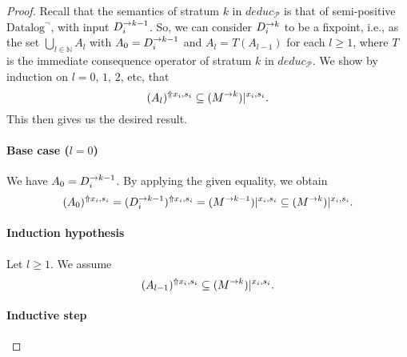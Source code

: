 \documentclass{tlp}
\newcommand{\langname}[1]{\text{#1}}  \newcommand{\pred}[1]{\mathtt{#1}}  \newcommand{\fname}[1]{\mathit{#1}}  \newcommand{\sq}[1]{`{#1}'}
\newcommand{\datalogneg}{\langname{Datalog}^{\neg}}
\newcommand{\Nat}{\mathbb{N}}  \newcommand{\len}[1]{|#1|} \newcommand{\rom}[1]{\text{\emph{(#1)}}} \newcommand{\romI}{\rom i}
\newcommand{\ded}{\mathcal{P}}
\newcommand{\sh}[1]{(#1)}
\newcommand{\addlt}[3]{#1^{\Uparrow#2,#3}}
\newcommand{\projlt}[3]{#1|^{#2,#3}}
\newcommand{\shprojlt}[3]{\projlt{\sh{#1}}{#2}{#3}}
\newcommand{\shaddlt}[3]{\addlt{\sh{#1}}{#2}{#3}}
\newcommand{\deduc}[1]{\fname{deduc}_{#1}}
\begin{document}
\begin{appendix}
\begin{proof}Recall that the semantics of stratum $k$ in $\deduc{\ded}$
is that of semi-positive $\datalogneg$, with input $D_{i}^{\to k-1}$.
So, we can consider $D_{i}^{\to k}$ to be a fixpoint, i.e., as the
set $\bigcup_{l\in\Nat}A_{l}$ with $A_{0}=D_{i}^{\to k-1}$ and
$A_{l}=T(A_{l-1})$ for each $l\geq1$, where $T$ is the immediate
consequence operator of stratum $k$ in $\deduc{\ded}$. We show by
induction on $l=0$, $1$, $2$, etc, that 
\[
\shaddlt{A_{l}}{x_{i}}{s_{i}}\subseteq\shprojlt{\strat Mk}{x_{i}}{s_{i}}.
\]
This then gives us the desired result.


\paragraph*{Base case ($l=0$)}

We have $A_{0}=D_{i}^{\to k-1}$. By applying the given equality,
we obtain 
\[
\shaddlt{A_{0}}{x_{i}}{s_{i}}=\shaddlt{\strat{D_{i}}{k-1}}{x_{i}}{s_{i}}=\shprojlt{\strat M{k-1}}{x_{i}}{s_{i}}\subseteq\shprojlt{\strat Mk}{x_{i}}{s_{i}}.
\]



\paragraph*{Induction hypothesis}

Let $l\geq1$. We assume 
\[
\shaddlt{A_{l-1}}{x_{i}}{s_{i}}\subseteq\shprojlt{\strat Mk}{x_{i}}{s_{i}}.
\]



\paragraph*{Inductive step}


\end{proof}
\end{appendix}
\end{document}
